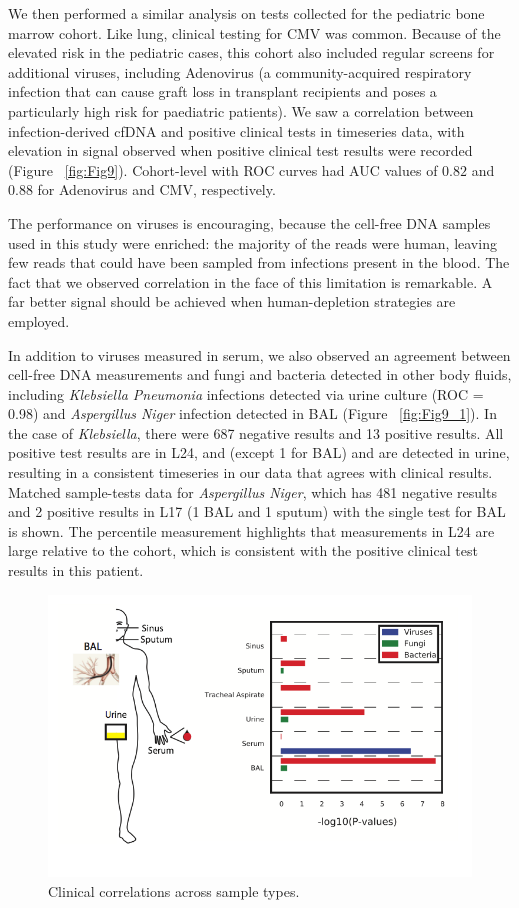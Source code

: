 We then performed a similar analysis on tests collected for the pediatric bone marrow cohort. Like lung, clinical testing for CMV was common. Because of the elevated risk in the pediatric cases, this cohort also included regular screens for additional viruses, including Adenovirus (a community-acquired respiratory infection that can cause graft loss in transplant recipients and poses a particularly high risk for paediatric patients). We saw a correlation between infection-derived cfDNA and positive clinical tests in timeseries data, with elevation in signal observed when positive clinical test results were recorded (Figure ~\ref{fig:Fig9}). Cohort-level with ROC curves had AUC values of $0.82$ and $0.88$ for Adenovirus and CMV, respectively. 

The performance on viruses is encouraging, because the cell-free DNA samples used in this study were enriched: the majority of the reads were human, leaving few reads that could have been sampled from infections present in the blood. The fact that we observed correlation in the face of this limitation is remarkable. A far better signal should be achieved when human-depletion strategies are employed. 

In addition to viruses measured in serum, we also observed an agreement between cell-free DNA measurements and fungi and bacteria detected in other body fluids, including \emph{Klebsiella Pneumonia} infections detected via urine culture (ROC = 0.98) and \emph{Aspergillus Niger} infection detected in BAL  (Figure ~\ref{fig:Fig9_1}). In the case of \emph{Klebsiella}, there were 687 negative results and 13 positive results. All positive test results are in L24, and (except 1 for BAL) and are detected in urine, resulting in a consistent timeseries in our data that agrees with clinical results. Matched sample-tests data for \emph{Aspergillus Niger}, which has 481 negative results and 2 positive results in L17 (1 BAL and 1 sputum) with the single test for BAL is shown.  The percentile measurement highlights that measurements in L24 are large relative to the cohort, which is consistent with the positive clinical test results in this patient.

\begin{figure}
\center\includegraphics[width=150mm,scale=0.5]{Figures/Fig9_2}
\caption{Clinical correlations across sample types.}
\label{fig:Fig9_2}
\end{figure}

